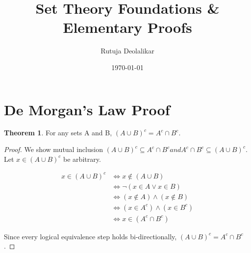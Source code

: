 \documentclass[12pt]{article}
\title{\textbf{Set Theory Foundations \& Elementary Proofs}}
\author{Rutuja Deolalikar}
\date{\today}
\theoremstyle{definition}
\newtheorem{theorem}{Theorem}
\begin{document}
\maketitle

\section*{De Morgan's Law Proof}
\begin{theorem}
    For any sets A and B, $(A \cup B)^c = A^c \cap B^c$.
\end{theorem}

\begin{proof}
We show mutual inclusion $(A \cup B)^c \subseteq A^c \cap B^c and A^c \cap B^c \subseteq (A \cup B)^c$.
Let $x \in (A \cup B)^c$ be arbitrary.

\begin{align*}
    x \in (A \cup B)^c &\iff x \notin (A \cup B) \\
    &\iff \neg (x \in A \lor x \in B) \\
    &\iff (x \notin A) \land (x \notin B) \\
    &\iff (x \in A^c) \land (x \in B^c) \\
    &\iff x \in (A^c \cap B^c)
\end{align*}

Since every logical equivalence step holds bi-directionally, $(A \cup B)^c = A^c \cap B^c$.
\end{proof}
\end{document}
